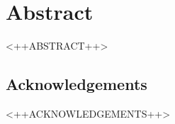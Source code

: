 \chapter*{Abstract} \label{chp:abstract}
<++ABSTRACT++>

\section*{Acknowledgements}
<++ACKNOWLEDGEMENTS++>
